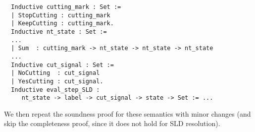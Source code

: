 \begin{lstlisting}
  Inductive cutting_mark : Set :=
  | StopCutting : cutting_mark
  | KeepCutting : cutting_mark.
  Inductive nt_state : Set :=
  ...
  | Sum  : cutting_mark -> nt_state -> nt_state -> nt_state
  ...
  Inductive cut_signal : Set :=
  | NoCutting  : cut_signal
  | YesCutting : cut_signal.
  Inductive eval_step_SLD :
     nt_state -> label -> cut_signal -> state -> Set := ...
\end{lstlisting}

We then repeat the soundness proof for these semantics with minor changes (and skip the completeness proof, since it does not hold for SLD resolution).
